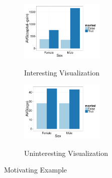 \begin{example}
\begin{figure}[h]
	\centering
	\begin{subfigure}{0.49\linewidth}
		{\includegraphics[width=4cm] {Images/HUHI_sex_avg_cap_gain.pdf}}
		\caption{Interesting Visualization}
		\label{fig:interesting_viz} 
	\end{subfigure}
	\begin{subfigure}{0.49\linewidth}
		\centering
		{\includegraphics[width=4cm] {Images/LULI_sex_avg_age.pdf}}
		\caption{Uninteresting Visualization}
		\label{fig:uninteresting_viz}
	\end{subfigure}
	\vspace{-10pt}
	\caption{Motivating Example}
	\label{fig:intro}
	\vspace{-10pt}
\end{figure}


\end{example}
